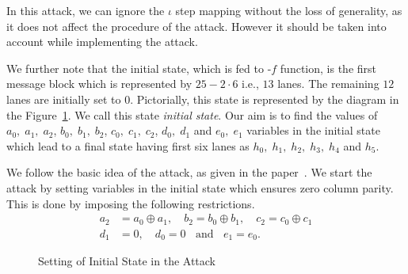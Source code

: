 In this attack, we can ignore the {$\iota$} step mapping without the loss of generality, as it does not affect the procedure of the attack. However it should be taken into account while implementing the attack.

We further note that the initial state, which is fed to \KECCAK-$f$ function, is the first message block which is represented by $25-2\cdot 6$ i.e., $13$ lanes. The remaining $12$ lanes are initially set to $0$. Pictorially, this state is represented by the diagram in the Figure~\ref{initial_state}. We call this state \emph{initial state}.
Our aim is to find the values of $a_0,\; a_1,\; a_2$, $b_0,\; b_1,\; b_2$, $c_0,\; c_1,\; c_2$, $d_0,\; d_1$ and $e_0,\; e_1$ variables in the initial state which lead to a final state having first six lanes as $h_0,\;h_1,\;h_2,\;h_3,\;h_4$ and $h_5$. 

We follow the basic idea of the attack, as given in the paper~\cite{naya2011practical}.
We start the attack by setting variables in the initial state which ensures zero column parity. 
This is done by imposing the following restrictions.
\begin{align}\nonumber
a_2 &= a_0 \oplus a_1,\quad b_2 = b_0 \oplus b_1, \quad c_2 = c_0 \oplus c_1\\ \label{cond_state1}
d_1 & = 0,\quad d_0 = 0\;\;\text{ and }\;\; e_1 = e_0. 
\end{align}

\begin{figure}
\begin{center}
\end{center}
\caption{Setting of Initial State in the Attack\label{initial_state}}
\end{figure}

